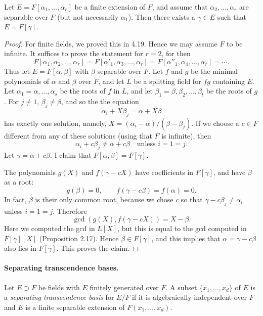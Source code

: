 \begin{theorem}
Let $E=F[\alpha_1,\ldots,\alpha_r]$ be a finite extension of $F$, and assume that $\alpha_2,\ldots,\alpha_r$ are separable over $F$ (but not necessarily $\alpha_1$). Then there exists a $\gamma\in E$ such that $E=F[\gamma]$.
\end{theorem}
\begin{proof}
For finite fields, we proved this in 4.19. Hence we may assume $F$ to be infinite. It suffices to prove the statement for $r=2$, for then
\[F[\alpha_1,\alpha_2,\ldots,\alpha_r]=F[\alpha'_1,\alpha_3,\ldots,\alpha_r]=F[\alpha''_1,\alpha_4,\ldots,\alpha_r]=\cdots.\]
Thus let $E=F[\alpha,\beta]$ with $\beta$ separable over $F$. Let $f$ and $g$ be the minimal polynomials of $\alpha$ and $\beta$ over $F$, and let $L$ be a splitting field for $fg$ containing $E$. Let $\alpha_1=\alpha,\ldots,\alpha_s$ be the roots of $f$ in $L$, and let $\beta_1=\beta,\beta_2,\ldots,\beta_t$ be the roots of $g$. For $j\ne1$, $\beta_j\ne\beta$, and so the the equation
\[\alpha_i+X\beta_j=\alpha+X\beta\]
has exactly one solution, namely, $X=(\alpha_i-\alpha)/(\beta-\beta_j)$. If we choose a $c\in F$ different from any of these solutions (using that $F$ is infinite), then
\[\alpha_i+c\beta_j\ne\alpha+c\beta\quad\text{unless }i=1=j.\]
Let $\gamma=\alpha+c\beta$. I claim that $F[\alpha,\beta]=F[\gamma]$.

The polynomials $g(X)$ and $f(\gamma-cX)$ have coefficients in $F[\gamma]$, and have $\beta$ as a root:
\[g(\beta)=0,\qquad f(\gamma-c\beta)=f(\alpha)=0.\]
In fact, $\beta$ is their only common root, because we chose $c$ so that $\gamma-c\beta_j\ne\alpha_i$ unless $i=1=j$. Therefore
\[\gcd(g(X),f(\gamma-cX))=X-\beta.\]
Here we computed the gcd in $L[X]$, but this is equal to the gcd computed in $F[\gamma][X]$ (Proposition 2.17). Hence $\beta\in F[\gamma]$, and this implies that $\alpha=\gamma-c\beta$ also lies in $F[\gamma]$. This proves the claim.
\end{proof}

\paragraph{Separating transcendence bases.}
Let $E\supset F$ be fields with $E$ finitely generated over $F$. A subset $\{x_1,\ldots,x_d\}$ of $E$ is a \emph{separating transcendence basis} for $E/F$ if it is algebraically independent over $F$ and $E$ is a finite separable extension of $F(x_1,\ldots,x_d)$.

